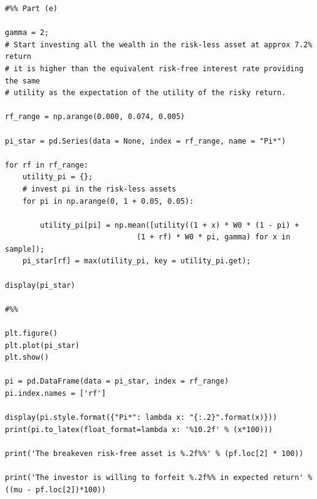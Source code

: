 \documentclass[10pt]{article}
\newenvironment{exercise}[2][Exercise]{\begin{trivlist}
  \item[\hskip \labelsep {\bfseries #1}\hskip \labelsep {\bfseries #2.}]}{\end{trivlist}}
\begin{document}
\begin{exercise}{2}
\begin{enumerate}[(a)]
\begin{lstlisting}
#%% Part (e)

gamma = 2;
# Start investing all the wealth in the risk-less asset at approx 7.2% return
# it is higher than the equivalent risk-free interest rate providing the same
# utility as the expectation of the utility of the risky return.

rf_range = np.arange(0.000, 0.074, 0.005)

pi_star = pd.Series(data = None, index = rf_range, name = "Pi*")

for rf in rf_range:
    utility_pi = {};
    # invest pi in the risk-less assets
    for pi in np.arange(0, 1 + 0.05, 0.05):
        
        utility_pi[pi] = np.mean([utility((1 + x) * W0 * (1 - pi) +
                              (1 + rf) * W0 * pi, gamma) for x in sample]);
    pi_star[rf] = max(utility_pi, key = utility_pi.get);
    
display(pi_star)

#%%

plt.figure()
plt.plot(pi_star)
plt.show()

pi = pd.DataFrame(data = pi_star, index = rf_range)
pi.index.names = ['rf']

display(pi.style.format({"Pi*": lambda x: "{:.2}".format(x)}))
print(pi.to_latex(float_format=lambda x: '%10.2f' % (x*100)))

print('The breakeven risk-free asset is %.2f%%' % (pf.loc[2] * 100))

print('The investor is willing to forfeit %.2f%% in expected return' % ((mu - pf.loc[2])*100))


\end{lstlisting}



\end{enumerate}
\end{exercise}
\end{document}
